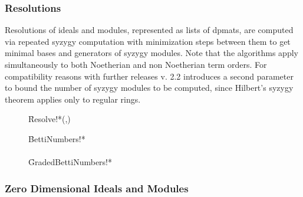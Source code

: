 \subsubsection{Resolutions}

Resolutions of ideals and modules, represented as lists of dpmats, are
computed via repeated syzygy computation with minimization steps
between them to get minimal bases and generators of syzygy
modules. Note that the algorithms apply simultaneously to both
Noetherian and non Noetherian term orders. For compatibility reasons
with further releases v. 2.2 introduces a second parameter to
bound the number of syzygy modules to be computed, since Hilbert's
syzygy theorem applies only to regular rings.
\begin{description}

\item[]
  \begin{syntax}
    \f{Resolve!*}(,)
  \end{syntax}
  \hypertarget{procedure:RESOLVE!*}{}

\item[]
  \begin{syntaxtable}
    \f{BettiNumbers!*} \\
    \\
    \f{GradedBettiNumbers!*} 
  \end{syntaxtable}
  \hypertarget{procedure:BETTINUMBERS!*}{}
  \hypertarget{procedure:GRADEDBETTINUMBERS!*}{}
\end{description}

\subsubsection{Zero Dimensional Ideals and Modules}

